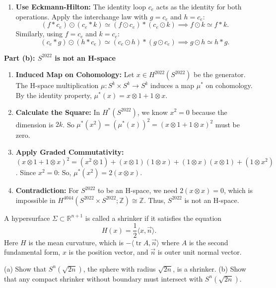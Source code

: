 \begin{solution}
\begin{enumerate}
    \item \textbf{Use Eckmann-Hilton:}
    The identity loop $c_e$ acts as the identity for both operations.
    Apply the interchange law with $g = c_e$ and $h = c_e$:
    \[ (f * c_e) \odot (c_e * k) \simeq (f \odot c_e) * (c_e \odot k) \implies f \odot k \simeq f * k. \]
    Similarly, using $f = c_e$ and $k = c_e$:
    \[ (c_e * g) \odot (h * c_e) \simeq (c_e \odot h) * (g \odot c_e) \implies g \odot h \simeq h * g. \]
\end{enumerate}

\textbf{Part (b): $S^{2022}$ is not an H-space}
\begin{enumerate}
    \item \textbf{Induced Map on Cohomology:}
    Let $x \in H^{2022}(S^{2022})$ be the generator. The H-space multiplication $\mu: S^k \times S^k \to S^k$ induces a map $\mu^*$ on cohomology.
    By the identity property, $\mu^*(x) = x \otimes 1 + 1 \otimes x$.
    
    \item \textbf{Calculate the Square:}
    In $H^*(S^{2022})$, we know $x^2 = 0$ because the dimension is $2k$.
    So $\mu^*(x^2) = (\mu^*(x))^2 = (x \otimes 1 + 1 \otimes x)^2$ must be zero.
    
    \item \textbf{Apply Graded Commutativity:}
    $(x \otimes 1 + 1 \otimes x)^2 = (x^2 \otimes 1) + (x \otimes 1)(1 \otimes x) + (1 \otimes x)(x \otimes 1) + (1 \otimes x^2)$.
    Since $x^2 = 0$:
    So, $\mu^*(x^2) = 2(x \otimes x)$.
    
    \item \textbf{Contradiction:}
    For $S^{2022}$ to be an H-space, we need $2(x \otimes x) = 0$, which is impossible in $H^{4044}(S^{2022} \times S^{2022}; \mathbb{Z}) \cong \mathbb{Z}$. Thus, $S^{2022}$ is not an H-space.
\end{enumerate}
\end{solution}

\begin{exercise}
\label{geometry:2022:6}
A hypersurface $\Sigma \subset \mathbb{R}^{n+1}$ is called a shrinker if it satisfies the equation
$$
H(x) = \frac{1}{2} \langle x, \vec{n} \rangle.
$$
Here $H$ is the mean curvature, which is $-\langle \operatorname{tr} A, \vec{n} \rangle$ where $A$ is the second fundamental form, $x$ is the position vector, and $\vec{n}$ is outer unit normal vector.

(a) Show that $S^n(\sqrt{2n})$, the sphere with radius $\sqrt{2n}$, is a shrinker.
(b) Show that any compact shrinker without boundary must intersect with $S^n(\sqrt{2n})$.
\end{exercise}

